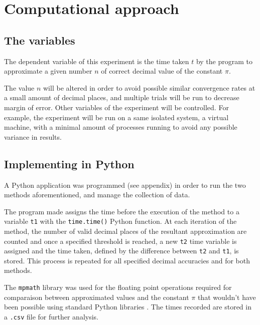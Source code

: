 \section{Computational approach}

\subsection{The variables}
The dependent variable of this experiment is the time taken $t$ by the program 
to approximate a given number $n$ of correct decimal value of the constant $\pi$.

The value $n$ will be altered in order to avoid possible similar convergence rates 
at a small amount of decimal places, and multiple trials will be run to decrease 
margin of error. Other variables of the experiment will be controlled. For example, the experiment 
will be run on a same isolated system, a virtual machine, with a minimal amount of 
processes running to avoid any possible variance in results. 


\subsection{Implementing in Python}

A Python application was programmed (see appendix) in order to run the two 
methods aforementioned, and manage the collection of data. 

The program made assigns the time before the execution of the method to a variable \verb|t1| 
with the \verb|time.time()| Python function. At each iteration of the method, the number of valid decimal 
places of the resultant approximation are counted and once a specified threshold is reached, 
a new \verb|t2| time variable is assigned and the time taken, defined by the difference between 
\verb|t2| and \verb|t1|, is stored. This process is repeated for all specified decimal accuracies and 
for both methods.

The \verb|mpmath| library was used for the floating point operations required 
for comparaison between approximated values and the constant $\pi$ that wouldn't 
have been possible using standard Python libraries \cite{mpmath}. The times recorded 
are stored in a \verb|.csv| file for further analysis. 